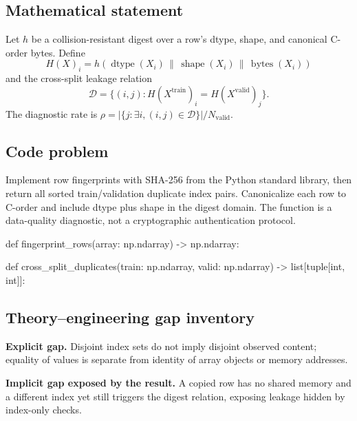 
        \subsection{Mathematical statement}


Let $h$ be a collision-resistant digest over a row's dtype, shape, and canonical
C-order bytes.  Define
\[
  H(X)_i=h(\operatorname{dtype}(X_i)\,\|\,\operatorname{shape}(X_i)\,\|\,\operatorname{bytes}(X_i))
\]
and the cross-split leakage relation
\[
  \mathcal D=\{(i,j):H(X^{\mathrm{train}})_i=H(X^{\mathrm{valid}})_j\}.
\]
The diagnostic rate is $\rho=|\{j:\exists i,(i,j)\in\mathcal D\}|/N_{\mathrm{valid}}$.


        \subsection{Code problem}


Implement row fingerprints with SHA-256 from the Python standard library, then
return all sorted train/validation duplicate index pairs.  Canonicalize each row
to C-order and include dtype plus shape in the digest domain.  The function is a
data-quality diagnostic, not a cryptographic authentication protocol.


        \begin{contractbox}
        \begin{Code}
        def fingerprint_rows(array: np.ndarray) -> np.ndarray:

def cross_split_duplicates(train: np.ndarray, valid: np.ndarray) -> list[tuple[int, int]]:
        \end{Code}
        \end{contractbox}

        \subsection{Theory--engineering gap inventory}

        \begin{gapbox}
        \textbf{Explicit gap.} Disjoint index sets do not imply disjoint observed content; equality of values is separate from identity of array objects or memory addresses.

        \textbf{Implicit gap exposed by the result.} A copied row has no shared memory and a different index yet still triggers the digest relation, exposing leakage hidden by index-only checks.
        \end{gapbox}

